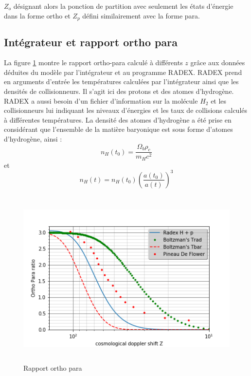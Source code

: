 \documentclass[10pt, a4paper]{report}
\numberwithin{equation}{subsection}
\begin{document}
$Z_o$ désignant alors la ponction de partition avec seulement les états d'énergie dans la forme ortho et $Z_p$ défini similairement avec la forme para.


\subsection{Intégrateur et rapport ortho para}

La figure \ref{fig:ROP} montre le rapport ortho-para calculé à différents $z$ grâce aux données déduites du modèle par l'intégrateur et au programme RADEX. RADEX prend en arguments d'entrée les températures calculées par l'intégrateur ainsi que les densités de collisionneurs. Il s'agit ici des protons et des atomes d'hydrogène. RADEX a aussi besoin d'un fichier d'information sur la molécule $H_2$ et les collisionneurs lui indiquant les niveaux d'énergies et les taux de collisions calculés à différentes températures. La densité des atomes d'hydrogène a été prise en considérant que l'ensemble de la matière baryonique est sous forme d'atomes d'hydrogène, ainsi :
\begin{equation} \label{eq:NHT0}
 \boxed{n_H(t_0) = \frac{\Omega_{b} \rho_c}{m_H c^2} }  
\end{equation}
et
\begin{equation} \label{eq:NH}
\boxed{n_H(t) = n_H(t_0) \left(\frac{a(t_0)}{a(t)}\right)^3 } 
\end{equation}


\begin{figure}[]
\centering
\includegraphics[width=14.0cm,height=9cm]{rop.png}
\caption{Rapport ortho para}
\label{fig:ROP}
\end{figure}
\end{document}

